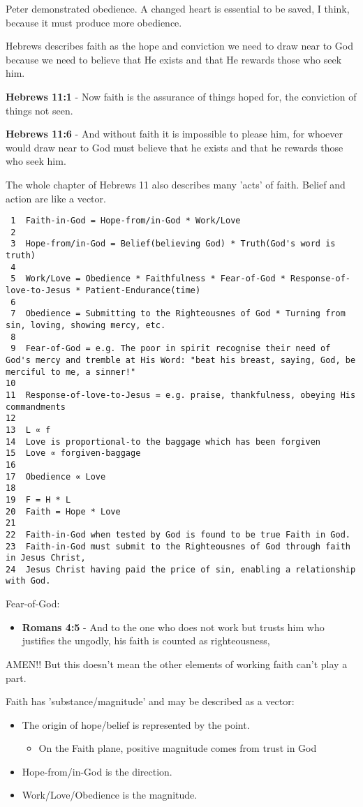 \documentclass[11pt]{article}
\begin{document}
Peter demonstrated obedience. A changed heart is essential to be saved, I think, because it must produce more obedience.

Hebrews describes faith as the hope and conviction we need to draw near to God because we need to believe that He exists and that He rewards those who seek him.

\textbf{Hebrews 11:1} - Now faith is the assurance of things hoped for, the conviction of things not seen.

\textbf{Hebrews 11:6} - And without faith it is impossible to please him, for whoever would draw near to God must believe that he exists and that he rewards those who seek him.

The whole chapter of Hebrews 11 also describes many 'acts' of faith. Belief and action are like a vector.

\begin{verbatim}
 1  Faith-in-God = Hope-from/in-God * Work/Love
 2  
 3  Hope-from/in-God = Belief(believing God) * Truth(God's word is truth)
 4  
 5  Work/Love = Obedience * Faithfulness * Fear-of-God * Response-of-love-to-Jesus * Patient-Endurance(time)
 6  
 7  Obedience = Submitting to the Righteousnes of God * Turning from sin, loving, showing mercy, etc.
 8  
 9  Fear-of-God = e.g. The poor in spirit recognise their need of God's mercy and tremble at His Word: "beat his breast, saying, God, be merciful to me, a sinner!"
10  
11  Response-of-love-to-Jesus = e.g. praise, thankfulness, obeying His commandments
12  
13  L ∝ f
14  Love is proportional-to the baggage which has been forgiven
15  Love ∝ forgiven-baggage
16  
17  Obedience ∝ Love
18  
19  F = H * L
20  Faith = Hope * Love
21  
22  Faith-in-God when tested by God is found to be true Faith in God.
23  Faith-in-God must submit to the Righteousnes of God through faith in Jesus Christ,
24  Jesus Christ having paid the price of sin, enabling a relationship with God.
\end{verbatim}

Fear-of-God:
\begin{itemize}
\item \textbf{Romans 4:5} - And to the one who does not work but trusts him who justifies the ungodly, his faith is counted as righteousness,
\end{itemize}

AMEN!! But this doesn't mean the other elements of working faith can't play a part.

Faith has 'substance/magnitude' and may be described as a vector:
\begin{itemize}
\item The origin of hope/belief is represented by the point.
\begin{itemize}
\item On the Faith plane, positive magnitude comes from trust in God
\end{itemize}
\item Hope-from/in-God is the direction.
\item Work/Love/Obedience is the magnitude.
\end{itemize}
\end{document}
